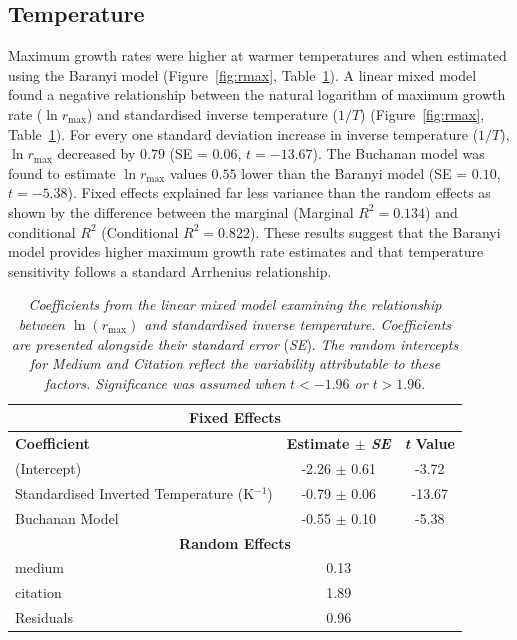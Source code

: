 \documentclass[11pt]{article}
\begin{document}
\subsection{Temperature}
Maximum growth rates were higher at warmer temperatures and when estimated using the Baranyi 
model (Figure~\ref{fig:rmax}, Table~\ref{tab:r_max_model}). 
A linear mixed model found a negative relationship between the natural logarithm 
of maximum growth rate ($\ln r_{\text{max}}$) and standardised inverse temperature 
($1/T$) (Figure~\ref{fig:rmax}, Table~\ref{tab:r_max_model}).
 For every one standard deviation increase in inverse 
temperature ($1/T$), $\ln r_{\text{max}}$ decreased by $0.79$ (SE = $0.06$, $t = -13.67$). The 
Buchanan model was found to estimate $\ln r_{\text{max}}$ values $0.55$ lower 
than the Baranyi model (SE = $0.10$, $t = -5.38$). Fixed effects explained far less 
variance than the random effects as shown by the difference between the marginal (Marginal 
$R^2 = 0.134$) and conditional $R^2$ (Conditional $R^2 = 0.822$). These 
results suggest that the Baranyi model provides higher maximum growth rate estimates and 
that temperature sensitivity follows a standard Arrhenius relationship.

\begin{table}[H]
\centering
\caption{\textit{Coefficients from the linear mixed model examining the relationship between $\ln(r_{\text{max}})$ and standardised inverse temperature. Coefficients are presented alongside their standard error} (\textit{SE}). \textit{The random intercepts for Medium and Citation reflect the variability attributable to these factors. Significance was assumed when} \textit{$t < -1.96$ or $t > 1.96$}.}
\vspace{0.5em}
\label{tab:r_max_model}
\begin{tabular}{lcc}
\toprule
\multicolumn{3}{c}{\textbf{Fixed Effects}} \\
\midrule
\textbf{Coefficient} & \textbf{Estimate $\pm$ \textit{SE}} & \textbf{\textit{t} Value} \\
\midrule
(Intercept) & -2.26 $\pm$ 0.61 & -3.72 \\
Standardised Inverted Temperature (K$^{-1}$) & -0.79 $\pm$ 0.06 & -13.67 \\
Buchanan Model & -0.55 $\pm$ 0.10 & -5.38 \\
\midrule
\multicolumn{3}{c}{\textbf{Random Effects}} \\
\midrule
medium & 0.13 &  \\
citation & 1.89 &  \\
Residuals & 0.96 &  \\
\bottomrule
\end{tabular}
\end{table}
\end{document}

